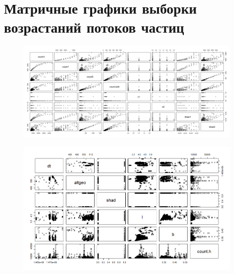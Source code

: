 \chapter{Матричные графики выборки возрастаний потоков частиц} 
\begin{figure}
	\centering
	\includegraphics[height=0.6\linewidth,width=0.6\textheight, angle=90]{images/Flash/Rplot06}
	\caption{}
	\label{fig:rplot06}
\end{figure}


\begin{figure}
	\centering
	\includegraphics[width=0.9\textheight, angle=90]{images/Flash/Rplot08}
	\caption{}
	\label{fig:rplot08}
\end{figure}


